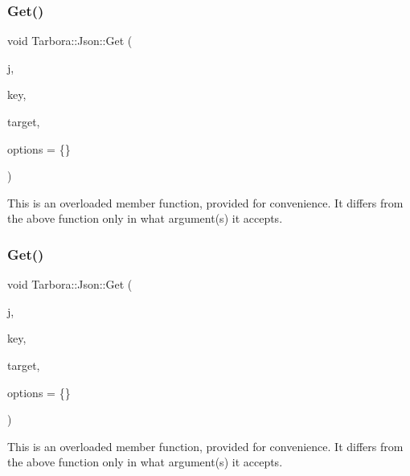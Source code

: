\subsubsection{\texorpdfstring{Get()}{Get()}\hspace{0.1cm}{\footnotesize\ttfamily [17/18]}}
{\footnotesize\ttfamily void Tarbora\+::\+Json\+::\+Get (\begin{DoxyParamCaption}\item[{raw\+\_\+json}]{j,  }\item[{int}]{key,  }\item[{unsigned int $\ast$}]{target,  }\item[{\hyperlink{structTarbora_1_1JsonOptions}{Json\+Options}}]{options = {\ttfamily \{\}} }\end{DoxyParamCaption})}

This is an overloaded member function, provided for convenience. It differs from the above function only in what argument(s) it accepts. \mbox{\label{classTarbora_1_1Json_a0ccf25e00e728669ecad4cebc9ac7765}} 
\subsubsection{\texorpdfstring{Get()}{Get()}\hspace{0.1cm}{\footnotesize\ttfamily [18/18]}}
{\footnotesize\ttfamily void Tarbora\+::\+Json\+::\+Get (\begin{DoxyParamCaption}\item[{raw\+\_\+json}]{j,  }\item[{int}]{key,  }\item[{std\+::string $\ast$}]{target,  }\item[{\hyperlink{structTarbora_1_1JsonOptions}{Json\+Options}}]{options = {\ttfamily \{\}} }\end{DoxyParamCaption})}

This is an overloaded member function, provided for convenience. It differs from the above function only in what argument(s) it accepts. \mbox{\label{classTarbora_1_1Json_ae3f68dde4705eb2c530e0ec51e2e05c5}} 
